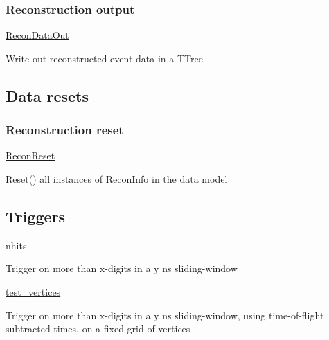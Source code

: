 \subsubsection*{Reconstruction output}


\begin{DoxyItemize}
\item \hyperlink{classReconDataOut}{Recon\-Data\-Out}
\begin{DoxyItemize}
\item Write out reconstructed event data in a {\ttfamily T\-Tree}
\end{DoxyItemize}
\end{DoxyItemize}

\subsection*{Data resets}

\subsubsection*{Reconstruction reset}


\begin{DoxyItemize}
\item \hyperlink{classReconReset}{Recon\-Reset}
\begin{DoxyItemize}
\item {\ttfamily Reset()} all instances of {\ttfamily \hyperlink{classReconInfo}{Recon\-Info}} in the data model
\end{DoxyItemize}
\end{DoxyItemize}

\subsection*{Triggers}


\begin{DoxyItemize}
\item nhits
\begin{DoxyItemize}
\item Trigger on more than x-\/digits in a y ns sliding-\/window
\end{DoxyItemize}
\item \hyperlink{classtest__vertices}{test\-\_\-vertices}
\begin{DoxyItemize}
\item Trigger on more than x-\/digits in a y ns sliding-\/window, using time-\/of-\/flight subtracted times, on a fixed grid of vertices
\end{DoxyItemize}
\end{DoxyItemize}

